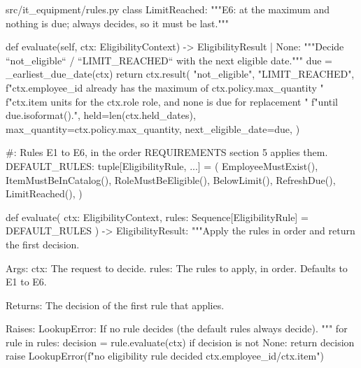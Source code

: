 \documentclass[11pt,letterpaper]{article}
\renewcommand{\_}{\textunderscore\allowbreak}
\begin{document}
\begin{codebox}{src/it_equipment/rules.py}
class LimitReached:
    """E6: at the maximum and nothing is due; always decides, so it must be last."""

    def evaluate(self, ctx: EligibilityContext) -> EligibilityResult | None:
        """Decide ``not_eligible`` / ``LIMIT_REACHED`` with the next eligible date."""
        due = _earliest_due_date(ctx)
        return ctx.result(
            "not_eligible",
            "LIMIT_REACHED",
            f"{ctx.employee_id} already has the maximum of {ctx.policy.max_quantity} "
            f"{ctx.item} units for the {ctx.role} role, and none is due for replacement "
            f"until {due.isoformat()}.",
            held=len(ctx.held_dates),
            max_quantity=ctx.policy.max_quantity,
            next_eligible_date=due,
        )


#: Rules E1 to E6, in the order REQUIREMENTS section 5 applies them.
DEFAULT_RULES: tuple[EligibilityRule, ...] = (
    EmployeeMustExist(),
    ItemMustBeInCatalog(),
    RoleMustBeEligible(),
    BelowLimit(),
    RefreshDue(),
    LimitReached(),
)


def evaluate(
    ctx: EligibilityContext, rules: Sequence[EligibilityRule] = DEFAULT_RULES
) -> EligibilityResult:
    """Apply the rules in order and return the first decision.

    Args:
        ctx: The request to decide.
        rules: The rules to apply, in order. Defaults to E1 to E6.

    Returns:
        The decision of the first rule that applies.

    Raises:
        LookupError: If no rule decides (the default rules always decide).
    """
    for rule in rules:
        decision = rule.evaluate(ctx)
        if decision is not None:
            return decision
    raise LookupError(f"no eligibility rule decided {ctx.employee_id}/{ctx.item}")
\end{codebox}
\end{document}
